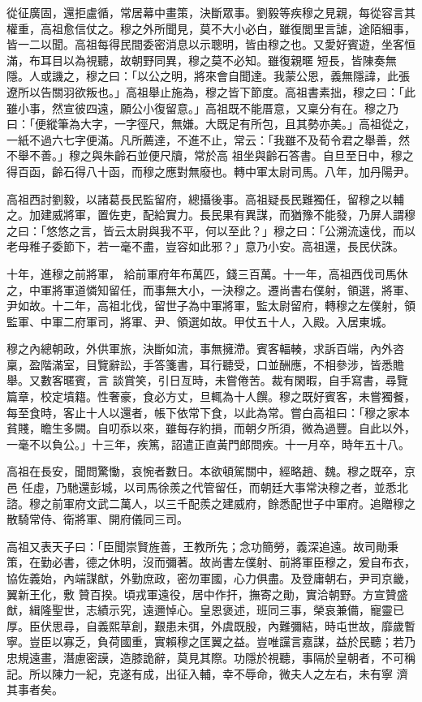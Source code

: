 \begin{pinyinscope}
 從征廣固，還拒盧循，常居幕中畫策，決斷眾事。劉毅等疾穆之見親，每從容言其權重，高祖愈信仗之。穆之外所聞見，莫不大小必白，雖復閭里言謔，途陌細事，皆一二以聞。高祖每得民間委密消息以示聰明，皆由穆之也。又愛好賓遊，坐客恒滿，布耳目以為視聽，故朝野同異，穆之莫不必知。雖復親暱
 短長，皆陳奏無隱。人或譏之，穆之曰：「以公之明，將來會自聞達。我蒙公恩，義無隱諱，此張遼所以告關羽欲叛也。」高祖舉止施為，穆之皆下節度。高祖書素拙，穆之曰：「此雖小事，然宣彼四遠，願公小復留意。」高祖既不能厝意，又稟分有在。穆之乃曰：「便縱筆為大字，一字徑尺，無嫌。大既足有所包，且其勢亦美。」高祖從之，一紙不過六七字便滿。凡所薦達，不進不止，常云：「我雖不及荀令君之舉善，然不舉不善。」穆之與朱齡石並便尺牘，常於高
 祖坐與齡石答書。自旦至日中，穆之得百函，齡石得八十函，而穆之應對無廢也。轉中軍太尉司馬。八年，加丹陽尹。



 高祖西討劉毅，以諸葛長民監留府，總攝後事。高祖疑長民難獨任，留穆之以輔之。加建威將軍，置佐吏，配給實力。長民果有異謀，而猶豫不能發，乃屏人謂穆之曰：「悠悠之言，皆云太尉與我不平，何以至此？」穆之曰：「公溯流遠伐，而以老母稚子委節下，若一毫不盡，豈容如此邪？」意乃小安。高祖還，長民伏誅。



 十年，進穆之前將軍，
 給前軍府年布萬匹，錢三百萬。十一年，高祖西伐司馬休之，中軍將軍道憐知留任，而事無大小，一決穆之。遷尚書右僕射，領選，將軍、尹如故。十二年，高祖北伐，留世子為中軍將軍，監太尉留府，轉穆之左僕射，領監軍、中軍二府軍司，將軍、尹、領選如故。甲仗五十人，入殿。入居東城。



 穆之內總朝政，外供軍旅，決斷如流，事無擁滯。賓客輻輳，求訴百端，內外咨稟，盈階滿室，目覽辭訟，手答箋書，耳行聽受，口並酬應，不相參涉，皆悉贍舉。又數客暱賓，言
 談賞笑，引日亙時，未嘗倦苦。裁有閑暇，自手寫書，尋覽篇章，校定墳籍。性奢豪，食必方丈，旦輒為十人饌。穆之既好賓客，未嘗獨餐，每至食時，客止十人以還者，帳下依常下食，以此為常。嘗白高祖曰：「穆之家本貧賤，瞻生多闕。自叨忝以來，雖每存約損，而朝夕所須，微為過豐。自此以外，一毫不以負公。」十三年，疾篤，詔遣正直黃門郎問疾。十一月卒，時年五十八。



 高祖在長安，聞問驚慟，哀惋者數日。本欲頓駕關中，經略趙、魏。穆之既卒，京邑
 任虛，乃馳還彭城，以司馬徐羨之代管留任，而朝廷大事常決穆之者，並悉北諮。穆之前軍府文武二萬人，以三千配羨之建威府，餘悉配世子中軍府。追贈穆之散騎常侍、衛將軍、開府儀同三司。



 高祖又表天子曰：「臣聞崇賢旌善，王教所先；念功簡勞，義深追遠。故司勛秉策，在勤必書，德之休明，沒而彌著。故尚書左僕射、前將軍臣穆之，爰自布衣，協佐義始，內端謀猷，外勤庶政，密勿軍國，心力俱盡。及登庸朝右，尹司京畿，翼新王化，敷
 贊百揆。頃戎軍遠役，居中作扞，撫寄之勛，實洽朝野。方宣贊盛猷，緝隆聖世，志績示究，遠邇悼心。皇恩褒述，班同三事，榮哀兼備，寵靈已厚。臣伏思尋，自義熙草創，艱患未弭，外虞既殷，內難彌結，時屯世故，靡歲暫寧。豈臣以寡乏，負荷國重，實賴穆之匡翼之益。豈唯讜言嘉謀，益於民聽；若乃忠規遠畫，潛慮密謨，造膝詭辭，莫見其際。功隱於視聽，事隔於皇朝者，不可稱記。所以陳力一紀，克遂有成，出征入輔，幸不辱命，微夫人之左右，未有寧
 濟其事者矣。




\end{pinyinscope}
